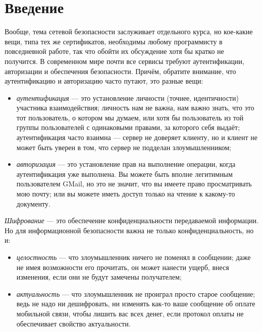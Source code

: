 \documentclass{../mcstext}
\begin{document}
\maketitle
\thispagestyle{empty}

\section{Введение}

Вообще, тема сетевой безопасности заслуживает отдельного курса, но кое-какие вещи, типа тех же сертификатов, необходимы любому программисту в повседневной работе, так что обойти их обсуждение хотя бы кратко не получится. В современном мире почти все сервисы требуют аутентификации, авторизации и обеспечения безопасности. Причём, обратите внимание, что аутентификацию и авторизацию часто путают, это разные вещи:

\begin{itemize}
    \item \textit{аутентификация} --- это установление личности (точнее, идентичности) участника взаимодействия; личность нам не важна, нам важно знать, что это тот пользователь, о котором мы думаем, или хотя бы пользователь из той группы пользователей с одинаковыми правами, за которого себя выдаёт; аутентификация часто взаимна --- сервер не доверяет клиенту, но и клиент не может быть уверен в том, что сервер не подделан злоумышленником;
    \item \textit{авторизация} --- это установление прав на выполнение операции, когда аутентификация уже выполнена. Вы можете быть вполне легитимным пользователем GMail, но это не значит, что вы имеете право просматривать мою почту; или вы можете иметь доступ только на чтение к какому-то документу.
\end{itemize}

\textit{Шифрование} --- это обеспечение конфиденциальности передаваемой информации. Но для информационной безопасности важна не только конфиденциальность, но и:

\begin{itemize}
    \item \textit{целостность} --- что злоумышленник ничего не поменял в сообщении; даже не имея возможности его прочитать, он может нанести ущерб, внеся изменения, если они не будут замечены получателем;
    \item \textit{актуальность} --- что злоумышленник не проиграл просто старое сообщение; ведь не надо ни дешифровать, ни изменять как-то ваше сообщение об оплате мобильной связи, чтобы лишить вас всех денег, если протокол оплаты не обеспечивает свойство актуальности.
\end{itemize}
\end{document}
